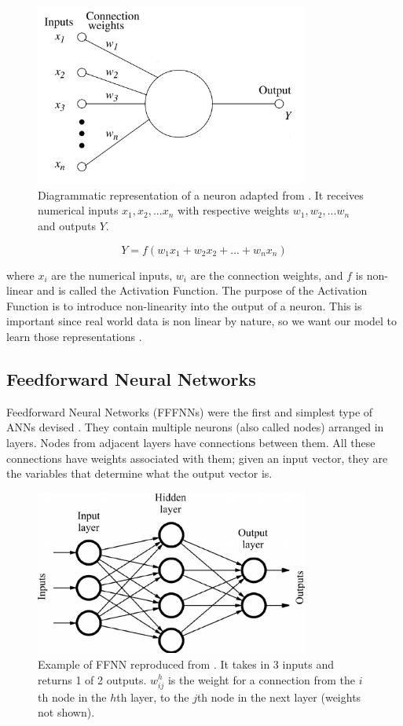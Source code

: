 \documentclass[11pt]{article}
\begin{document}
\begin{figure}[htp]
    \centering
    \includegraphics[width=9cm]{figures/neuron.png}
    \caption{ Diagrammatic representation of a neuron adapted from \cite{neuron}. It receives numerical inputs $x_1, x_2, ... x_n$ with respective weights $w_1, w_2, ... w_n$ and outputs $Y$.}
 \end{figure}   


\begin{equation}
Y = f(w_{1}x_{1}+w_{2}x_{2}+...+ w_{n}x_{n})
\end{equation} 

where ${x_i}$ are the numerical inputs, ${w_i}$ are the connection weights, and $f$ is non-linear and is called the Activation Function. The purpose of the Activation Function is to introduce non-linearity into the output of a neuron. This is important since real world data is non linear by nature, so we want our model to learn those representations \cite{baeldung}. 

\subsection{Feedforward Neural Networks}

Feedforward Neural Networks (FFFNNs) were the first and simplest type of ANNs devised \cite{ffnn}. They contain multiple neurons (also called nodes) arranged in layers. Nodes from adjacent layers have connections between them. All these connections have weights associated with them; given an input vector, they are the variables that determine what the output vector is. \newline

\begin{figure}[htp]
    \centering
    \includegraphics[width=9cm]{figures/ffnn2.png}
    \caption{Example of FFNN reproduced from \cite{ffnnpic}. It takes in 3 inputs and returns 1 of 2 outputs. $w^{h}_{ij}$ is the weight for a connection from the $i$th node in the $h$th layer, to the $j$th node in the next layer (weights not shown).}
 \end{figure}  
 
\end{document}
